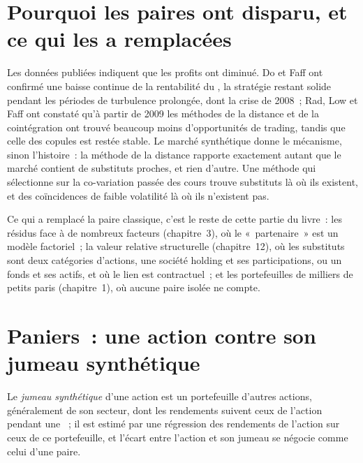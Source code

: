 \section{Pourquoi les paires ont disparu, et ce qui les a remplacées}

Les données publiées indiquent que les profits ont diminué. Do et Faff ont confirmé une baisse continue de la rentabilité du , la stratégie
restant solide pendant les périodes de turbulence prolongée, dont la crise de 2008~; Rad, Low et Faff ont constaté qu'à partir de 2009 les méthodes de la distance et de la cointégration ont trouvé
beaucoup moins d'opportunités de trading, tandis que celle des copules est restée stable. Le marché synthétique donne le mécanisme, sinon l'histoire~: la méthode de la distance
rapporte exactement autant que le marché contient de substituts proches, et rien d'autre. Une méthode qui sélectionne sur la co-variation passée des cours trouve
substituts là où ils existent, et des coïncidences de faible volatilité là où ils n'existent pas.

Ce qui a remplacé la paire classique, c'est le reste de cette partie du livre~: les résidus face à de nombreux facteurs (chapitre~3), où le «~partenaire~» est un modèle factoriel~;
la valeur relative structurelle (chapitre~12), où les substituts sont deux catégories d'actions, une société holding et ses participations, ou un fonds et ses actifs, et où le
lien est contractuel~; et les portefeuilles de milliers de petits paris (chapitre~1), où aucune paire isolée ne compte.

\section{Paniers~: une action contre son jumeau synthétique}

\begin{definition}\label{def:s1:pairs-and-baskets:twin}
Le \emph{jumeau synthétique} d'une action est un portefeuille d'autres actions, généralement de son secteur, dont les rendements suivent ceux de l'action pendant une
~; il est estimé par une régression des rendements de l'action sur ceux de ce portefeuille, et l'écart entre l'action et son jumeau se négocie comme celui d'une paire.
\end{definition}

